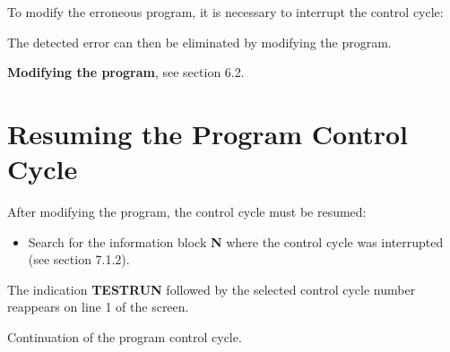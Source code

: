 To modify the erroneous program, it is necessary to interrupt the control cycle:

\begin{itemize}
\end{itemize}
\vspace{.5cm}

\begin{itemize}
\end{itemize}
\vspace{.5cm}

The detected error can then be eliminated by modifying the program.

\textbf{Modifying the program}, see section 6.2.

\begin{itemize}
\end{itemize}

\vspace{.5cm}

\section{Resuming the Program Control Cycle}

After modifying the program, the control cycle must be resumed:

\begin{itemize}
    \item Search for the information block \textbf{N} where the control cycle was interrupted (see section 7.1.2).
\end{itemize}

\begin{itemize}
\end{itemize}
\vspace{.5cm}

The indication \textbf{TESTRUN} followed by the selected control cycle number reappears on line 1 of the screen.

\begin{itemize}
\end{itemize}
\vspace{.5cm}

Continuation of the program control cycle.

